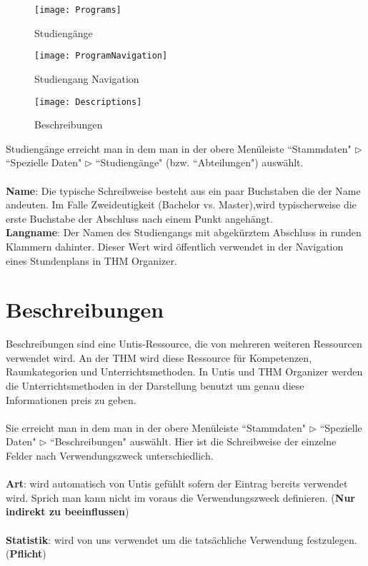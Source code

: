 \begin{wrapfigure}{r}{0.4\textwidth}
	\vspace{-14pt}
	\texttt{[image: Programs]}
	\vspace{-5pt}
	\caption{Studiengänge}
	\label{fig:programs}
	\vspace{24pt}
	\texttt{[image: ProgramNavigation]}
	\vspace{-5pt}
	\caption{Studiengang Navigation}
	\label{fig:program-navigation}
	\vspace{24pt}
	\texttt{[image: Descriptions]}
	\vspace{-15pt}
	\caption{Beschreibungen}
	\label{fig:descriptions}
	\vspace{-45pt}
\end{wrapfigure}

Studiengänge erreicht man in dem man in der obere Menüleiste ``Stammdaten" $\triangleright$ ``Spezielle Daten" $\triangleright$ ``Studiengänge" (bzw. ``Abteilungen") auswählt.\\
\\
\textbf{Name}: Die typische Schreibweise besteht aus ein paar Buchstaben die der Name andeuten. Im Falle Zweideutigkeit (Bachelor vs. Master),wird typischerweise die erste Buchstabe der Abschluss nach einem Punkt angehängt.\\

\noindent
\textbf{Langname}: Der Namen des Studiengangs mit abgekürztem Abschluss in runden Klammern dahinter. Dieser Wert wird öffentlich verwendet in der Navigation eines Stundenplans in THM Organizer.

\section{Beschreibungen}

Beschreibungen sind eine Untis-Ressource, die von mehreren weiteren Ressourcen verwendet wird. An der THM wird diese Ressource für Kompetenzen, Raumkategorien und Unterrichtsmethoden. In Untis und THM Organizer werden die Unterrichtsmethoden in der Darstellung benutzt um genau diese Informationen preis zu geben.\\
\\
Sie erreicht man in dem man in der obere Menüleiste ``Stammdaten" $\triangleright$ ``Spezielle Daten" $\triangleright$ ``Beschreibungen" auswählt. Hier ist die Schreibweise der einzelne Felder nach Verwendungszweck unterschiedlich.\\
\\
\textbf{Art}: wird automatisch von Untis gefühlt sofern der Eintrag bereits verwendet wird. Sprich man kann nicht im voraus die Verwendungszweck definieren. (\textbf{Nur indirekt zu beeinflussen})\\
\\
\textbf{Statistik}: wird von uns verwendet um die tatsächliche Verwendung festzulegen. (\textbf{Pflicht})

